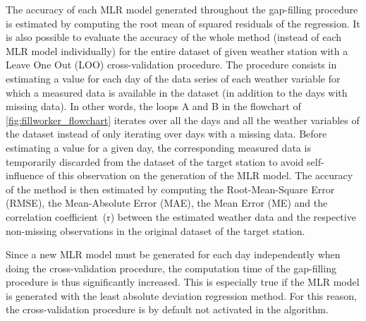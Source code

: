 \documentclass[TechnicalNoteMeteo.tex]{subfiles}
\begin{document}
The accuracy of each MLR model generated throughout the gap-filling procedure is estimated by computing the root mean of squared residuals of the regression. It is also possible to evaluate the accuracy of the whole method (instead of each MLR model individually) for the entire dataset of given weather station with a Leave One Out (LOO) cross-validation procedure. The procedure consists in estimating a value for each day of the data series of each weather variable for which a measured data is available in the dataset (in addition to the days with missing data). In other words, the loops A and B in the flowchart of \cref{fig:fillworker_flowchart} iterates over all the days and all the weather variables of the dataset instead of only iterating over days with a missing data. Before estimating a value for a given day, the corresponding measured data is temporarily discarded from the dataset of the target station to avoid self-influence of this observation on the generation of the MLR model. The accuracy of the method is then estimated by computing the Root-Mean-Square Error (RMSE), the Mean-Absolute Error (MAE), the Mean Error (ME) and the correlation coefficient~(r) between the estimated weather data and the respective non-missing observations in the original dataset of the target station.

Since a new MLR model must be generated for each day independently when doing the cross-validation procedure, the computation time of the gap-filling procedure is thus significantly increased. This is especially true if the MLR model is generated with the least absolute deviation regression method. For this reason, the cross-validation procedure is by default not activated in the algorithm.
\end{document}
